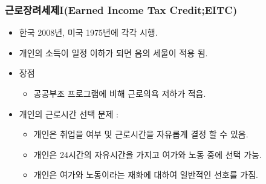 \documentclass[aspectratio=169,xcolor=dvipsnames,handout]{beamer}
\begin{document}
\begin{frame}[<+->]
\frametitle{근로장려세제I(Earned Income Tax Credit;EITC)}
    \begin{itemize}
        \item 한국 2008년, 미국 1975년에 각각 시행.
        \item 개인의 소득이 일정 이하가 되면 음의 세울이 적용 됨. 
        \item 장점
        \begin{itemize}
            \item 공공부조 프로그램에 비해 근로의욕 저하가 적음.
        \end{itemize} 
        \item 개인의 근로시간 선택 문제 : 
        \begin{itemize}
            \item 개인은 취업을 여부 및 근로시간을 자유롭게 결정 할 수 있음.
            \item 개인은 24시간의 자유시간을 가지고 여가와 노동 중에 선택 가능.
            \item 개인은 여가와 노동이라는 재화에 대하여 일반적인 선호를 가짐.
        \end{itemize} 
    \end{itemize}
\end{frame}
\end{document}
